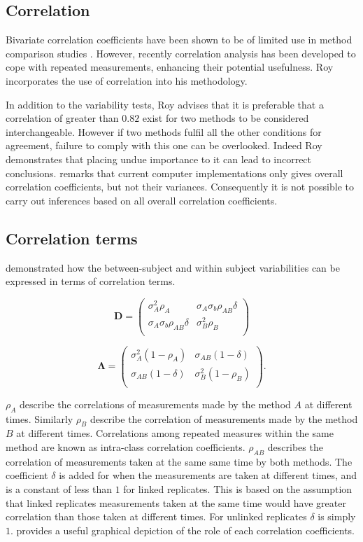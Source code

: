 \documentclass[12pt, a4paper]{report}
\theoremstyle{plain}
\theoremstyle{definition}
\theoremstyle{remark}
\begin{document}
\subsection{Correlation}



Bivariate correlation coefficients have been shown to be of
limited use in method comparison studies \citep{BA86}. However,
recently correlation analysis has been developed to cope with
repeated measurements, enhancing their potential usefulness. Roy
incorporates the use of correlation into his methodology.


	In addition to the variability tests, Roy advises that it is preferable that a correlation of greater than $0.82$ exist for two methods to be considered interchangeable. However if two methods fulfil all the other conditions for agreement, failure to comply with this one can be overlooked. Indeed Roy demonstrates that placing undue importance to it can lead to incorrect conclusions. \citet{ARoy2009} remarks that current computer implementations only gives overall correlation coefficients, but not their variances. Consequently it is not possible to carry out inferences based on all overall correlation coefficients.
	
\subsection{Correlation terms}
\citet{hamlett} demonstrated how the between-subject and within subject variabilities can be expressed in terms of
correlation terms.

\[
\boldsymbol{D} = \left( \begin{array}{cc}
\sigma^2_{A}\rho_{A} & \sigma_{A}\sigma_{b}\rho_{AB}\delta \\
\sigma_{A}\sigma_{b}\rho_{AB}\delta & \sigma^2_{B}\rho_{B}\\

\end{array}\right)
\]

\[
\boldsymbol{\Lambda} = \left(
\begin{array}{cc}
\sigma^2_{A}(1-\rho_{A}) & \sigma_{AB}(1-\delta)  \\
\sigma_{AB}(1-\delta) & \sigma^2_{B}(1-\rho_{B}) \\
\end{array}\right).
\]

$\rho_{A}$ describe the correlations of measurements made by the method $A$ at different times. Similarly $\rho_{B}$ describe the correlation of measurements made by the method $B$ at different times. Correlations among repeated measures within the same method are known as intra-class correlation coefficients. $\rho_{AB}$ describes the correlation of measurements taken at the same same time by both methods. The coefficient $\delta$ is added for when the measurements are taken at different times, and is a constant of less than $1$ for linked replicates. This is based on the assumption that linked replicates measurements taken at the same time would have greater correlation than those taken at different times. For unlinked replicates $\delta$ is simply $1$. \citet{hamlett} provides a useful graphical depiction of the role of each correlation coefficients.
\end{document}
